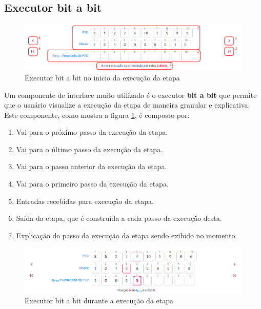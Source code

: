 \subsection{Executor bit a bit}

\begin{figure}[H]
    \centering
    \caption{Executor bit a bit no inicio da execução da etapa}
    \label{fig:uibitabit}
    \includegraphics[width=1\linewidth]{UI/UIBitABit.png}
\end{figure}

Um componente de interface muito utilizado é o executor \textbf{bit a bit} que permite que o usuário visualize a execução da etapa de maneira granular e explicativa. Este componente, como mostra a figura \ref{fig:uibitabit}, é composto por:
\begin{enumerate}
    \item Vai para o próximo passo da execução da etapa.
    \item Vai para o último passo da execução da etapa.
    \item Vai para o passo anterior da execução da etapa.
    \item Vai para o primeiro passo da execução da etapa.
    \item Entradas recebidas para execução da etapa.
    \item Saída da etapa, que é construída a cada passo da execução desta.
    \item Explicação do passo da execução da etapa sendo exibido no momento.
\end{enumerate}

\begin{figure}[H]
    \centering
    \caption{Executor bit a bit durante a execução da etapa}
    \label{fig:uibitabit2}
    \includegraphics[width=1\linewidth]{UI/UIBitABit2.png}
\end{figure}

